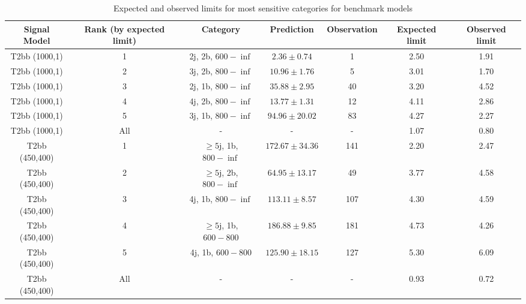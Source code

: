 \begin{landscape}
\begin{longtable}{ccccccc}
\caption{Expected and observed limits for most sensitive categories for benchmark models} \label{tab:benchMarkTable_T2bb} \\    \hline
Signal Model & Rank (by expected limit) & Category & Prediction & Observation & Expected limit & Observed limit\\ \hline
T2bb (1000,1) & 1 & 2j, 2b, $600-\inf$ & $2.36 \pm 0.74$ & 1 & 2.50 & 1.91\\ 
T2bb (1000,1) & 2 & 3j, 2b, $800-\inf$ & $10.96 \pm 1.76$ & 5 & 3.01 & 1.70\\ 
T2bb (1000,1) & 3 & 2j, 1b, $800-\inf$ & $35.88 \pm 2.95$ & 40 & 3.20 & 4.52\\ 
T2bb (1000,1) & 4 & 4j, 2b, $800-\inf$ & $13.77 \pm 1.31$ & 12 & 4.11 & 2.86\\ 
T2bb (1000,1) & 5 & 3j, 1b, $800-\inf$ & $94.96 \pm 20.02$ & 83 & 4.27 & 2.27\\ 
T2bb (1000,1) & All & - & - & - & 1.07 & 0.80\\ 
T2bb (450,400) & 1 & $\ge5$j, 1b, $800-\inf$ & $172.67 \pm 34.36$ & 141 & 2.20 & 2.47\\ 
T2bb (450,400) & 2 & $\ge5$j, 2b, $800-\inf$ & $64.95 \pm 13.17$ & 49 & 3.77 & 4.58\\ 
T2bb (450,400) & 3 & 4j, 1b, $800-\inf$ & $113.11 \pm 8.57$ & 107 & 4.30 & 4.59\\ 
T2bb (450,400) & 4 & $\ge5$j, 1b, $600-800$ & $186.88 \pm 9.85$ & 181 & 4.73 & 4.26\\ 
T2bb (450,400) & 5 & 4j, 1b, $600-800$ & $125.90 \pm 18.15$ & 127 & 5.30 & 6.09\\ 
T2bb (450,400) & All & - & - & - & 0.93 & 0.72\\ 
\hline
\hline
\end{longtable}
\end{landscape}

